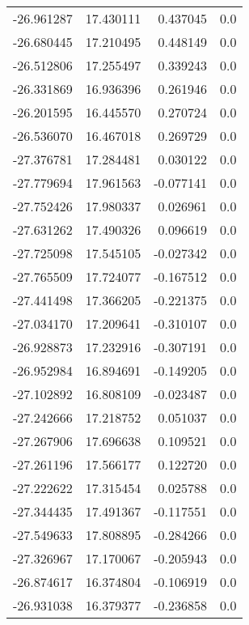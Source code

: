 \begin{tabular}{rrrr}
      -26.961287 &        17.430111 &    0.437045 &   0.0 \\
      -26.680445 &        17.210495 &    0.448149 &   0.0 \\
      -26.512806 &        17.255497 &    0.339243 &   0.0 \\
      -26.331869 &        16.936396 &    0.261946 &   0.0 \\
      -26.201595 &        16.445570 &    0.270724 &   0.0 \\
      -26.536070 &        16.467018 &    0.269729 &   0.0 \\
      -27.376781 &        17.284481 &    0.030122 &   0.0 \\
      -27.779694 &        17.961563 &   -0.077141 &   0.0 \\
      -27.752426 &        17.980337 &    0.026961 &   0.0 \\
      -27.631262 &        17.490326 &    0.096619 &   0.0 \\
      -27.725098 &        17.545105 &   -0.027342 &   0.0 \\
      -27.765509 &        17.724077 &   -0.167512 &   0.0 \\
      -27.441498 &        17.366205 &   -0.221375 &   0.0 \\
      -27.034170 &        17.209641 &   -0.310107 &   0.0 \\
      -26.928873 &        17.232916 &   -0.307191 &   0.0 \\
      -26.952984 &        16.894691 &   -0.149205 &   0.0 \\
      -27.102892 &        16.808109 &   -0.023487 &   0.0 \\
      -27.242666 &        17.218752 &    0.051037 &   0.0 \\
      -27.267906 &        17.696638 &    0.109521 &   0.0 \\
      -27.261196 &        17.566177 &    0.122720 &   0.0 \\
      -27.222622 &        17.315454 &    0.025788 &   0.0 \\
      -27.344435 &        17.491367 &   -0.117551 &   0.0 \\
      -27.549633 &        17.808895 &   -0.284266 &   0.0 \\
      -27.326967 &        17.170067 &   -0.205943 &   0.0 \\
      -26.874617 &        16.374804 &   -0.106919 &   0.0 \\
      -26.931038 &        16.379377 &   -0.236858 &   0.0 \\

\end{tabular}
